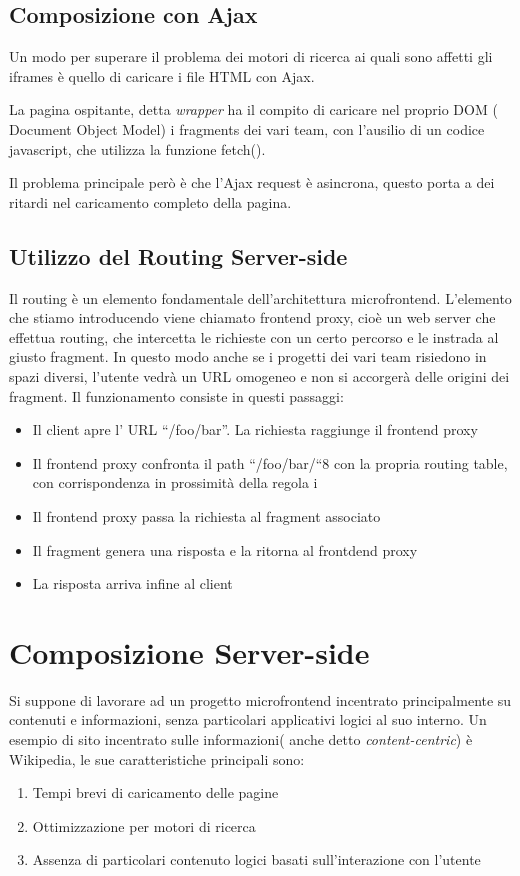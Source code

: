 \subsection{Composizione con Ajax}
Un modo per superare il problema dei motori di ricerca ai quali sono affetti gli iframes è quello di 
caricare i file HTML con Ajax.

La pagina ospitante, detta \emph{wrapper} ha il compito di caricare nel proprio DOM ( Document Object Model) i fragments dei vari 
team, con l'ausilio di un codice javascript, che utilizza la funzione fetch().

Il problema principale però è che l’Ajax request è asincrona, 
questo porta a dei ritardi nel caricamento completo della pagina.

\subsection{Utilizzo del Routing Server-side}
Il routing è un elemento fondamentale dell’architettura microfrontend.
L’elemento che stiamo introducendo viene chiamato frontend proxy, cioè un web server che effettua routing,
 che intercetta le richieste con un certo percorso e le instrada al giusto fragment. In questo modo anche se
  i progetti dei vari team risiedono in spazi diversi, l’utente vedrà un URL omogeneo e non si accorgerà delle origini dei fragment.
Il funzionamento consiste in questi passaggi:
\begin{itemize}
    \item Il client apre l’ URL “/foo/bar”. La richiesta raggiunge il frontend proxy
    \item Il frontend proxy confronta il path “/foo/bar/“8 con la propria routing table, con corrispondenza in prossimità della regola i
    \item Il frontend proxy passa la richiesta al fragment associato
    \item Il fragment genera una risposta e la ritorna al frontdend proxy
    \item La risposta arriva infine al client
\end{itemize}


\pagebreak

\section{Composizione Server-side}
Si suppone di lavorare ad un progetto microfrontend incentrato principalmente su contenuti e informazioni, senza particolari applicativi logici al suo interno.
Un esempio di sito incentrato sulle informazioni( anche detto \emph{content-centric}) è Wikipedia, le sue caratteristiche principali sono:
\begin{enumerate}
    \item Tempi brevi di caricamento delle pagine
    \item Ottimizzazione per motori di ricerca
    \item Assenza di particolari contenuto logici basati sull'interazione con l'utente
\end{enumerate}

